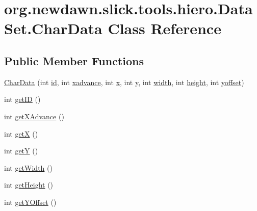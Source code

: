 \hypertarget{classorg_1_1newdawn_1_1slick_1_1tools_1_1hiero_1_1_data_set_1_1_char_data}{}\section{org.\+newdawn.\+slick.\+tools.\+hiero.\+Data\+Set.\+Char\+Data Class Reference}
\label{classorg_1_1newdawn_1_1slick_1_1tools_1_1hiero_1_1_data_set_1_1_char_data}
\subsection*{Public Member Functions}
\begin{DoxyCompactItemize}
\item 
\mbox{\hyperlink{classorg_1_1newdawn_1_1slick_1_1tools_1_1hiero_1_1_data_set_1_1_char_data_a4e2f42be6696d0d2a7be8c4f8fd9c43b}{Char\+Data}} (int \mbox{\hyperlink{classorg_1_1newdawn_1_1slick_1_1tools_1_1hiero_1_1_data_set_1_1_char_data_a32705dfd59a917f2f9751e3354432c27}{id}}, int \mbox{\hyperlink{classorg_1_1newdawn_1_1slick_1_1tools_1_1hiero_1_1_data_set_1_1_char_data_aca19a5c45977a31b653943cd478e76cd}{xadvance}}, int \mbox{\hyperlink{classorg_1_1newdawn_1_1slick_1_1tools_1_1hiero_1_1_data_set_1_1_char_data_a78da82c8566e1eefdc8a7c93526d3a33}{x}}, int \mbox{\hyperlink{classorg_1_1newdawn_1_1slick_1_1tools_1_1hiero_1_1_data_set_1_1_char_data_a699420a1ac403133684164c370077f7e}{y}}, int \mbox{\hyperlink{classorg_1_1newdawn_1_1slick_1_1tools_1_1hiero_1_1_data_set_1_1_char_data_a8f410ca610493f3f3a5e7a2c7a546739}{width}}, int \mbox{\hyperlink{classorg_1_1newdawn_1_1slick_1_1tools_1_1hiero_1_1_data_set_1_1_char_data_ad9c673d8f3b449d6a57ea4af78846d62}{height}}, int \mbox{\hyperlink{classorg_1_1newdawn_1_1slick_1_1tools_1_1hiero_1_1_data_set_1_1_char_data_a007113e4ab007cbfe00de48954851d25}{yoffset}})
\item 
int \mbox{\hyperlink{classorg_1_1newdawn_1_1slick_1_1tools_1_1hiero_1_1_data_set_1_1_char_data_ac38124403806c9ee42a09417bc0fec75}{get\+ID}} ()
\item 
int \mbox{\hyperlink{classorg_1_1newdawn_1_1slick_1_1tools_1_1hiero_1_1_data_set_1_1_char_data_afbf008c2341bc8f9f3db61b508031236}{get\+X\+Advance}} ()
\item 
int \mbox{\hyperlink{classorg_1_1newdawn_1_1slick_1_1tools_1_1hiero_1_1_data_set_1_1_char_data_af6ae0c091236cc4332ec0762b9416f01}{getX}} ()
\item 
int \mbox{\hyperlink{classorg_1_1newdawn_1_1slick_1_1tools_1_1hiero_1_1_data_set_1_1_char_data_a47dc16b89b0ea7928ac218ec6333b2d4}{getY}} ()
\item 
int \mbox{\hyperlink{classorg_1_1newdawn_1_1slick_1_1tools_1_1hiero_1_1_data_set_1_1_char_data_a858e5573cd666d1090ce83e3ab756b20}{get\+Width}} ()
\item 
int \mbox{\hyperlink{classorg_1_1newdawn_1_1slick_1_1tools_1_1hiero_1_1_data_set_1_1_char_data_a79c00a11618519fa506f312d1808eba6}{get\+Height}} ()
\item 
int \mbox{\hyperlink{classorg_1_1newdawn_1_1slick_1_1tools_1_1hiero_1_1_data_set_1_1_char_data_a5a3d3067a80d397b5b2a5da863ae0869}{get\+Y\+Offset}} ()
\end{DoxyCompactItemize}
